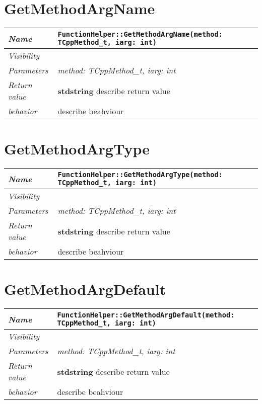  \section{GetMethodArgName}
\begin{longtable}{p{3cm} @{\hskip 1cm} p{12cm}}
 \hline
\textit{Name} & \texttt{FunctionHelper::GetMethodArgName(method: TCppMethod_t, iarg: int)}\\
\hline
 \textit{Visibility} & \\
\hline
\textit{Parameters} & \textit{method: TCppMethod_t, iarg: int}\\
\hline
\textit{Return value} & \textbf{ stdstring} describe return value\\
  \hline
 \textit{behavior} & describe beahviour \\
\hline
\end{longtable} \pagebreak
 \section{GetMethodArgType}
\begin{longtable}{p{3cm} @{\hskip 1cm} p{12cm}}
 \hline
\textit{Name} & \texttt{FunctionHelper::GetMethodArgType(method: TCppMethod_t, iarg: int)}\\
\hline
 \textit{Visibility} & \\
\hline
\textit{Parameters} & \textit{method: TCppMethod_t, iarg: int}\\
\hline
\textit{Return value} & \textbf{ stdstring} describe return value\\
  \hline
 \textit{behavior} & describe beahviour \\
\hline
\end{longtable} \pagebreak
 \section{GetMethodArgDefault}
\begin{longtable}{p{3cm} @{\hskip 1cm} p{12cm}}
 \hline
\textit{Name} & \texttt{FunctionHelper::GetMethodArgDefault(method: TCppMethod_t, iarg: int)}\\
\hline
 \textit{Visibility} & \\
\hline
\textit{Parameters} & \textit{method: TCppMethod_t, iarg: int}\\
\hline
\textit{Return value} & \textbf{ stdstring} describe return value\\
  \hline
 \textit{behavior} & describe beahviour \\
\hline
\end{longtable} \pagebreak
